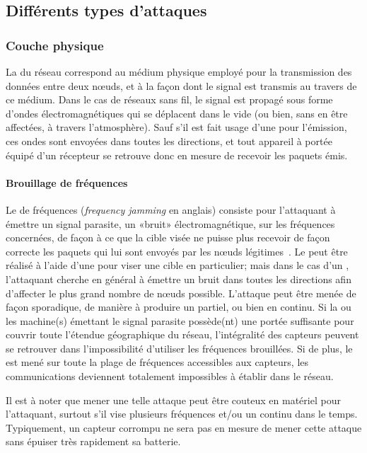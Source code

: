 \subsection{Différents types d'attaques}

    \subsubsection{Couche physique}
La  du réseau correspond au médium physique employé pour la transmission des données entre deux nœuds, et à la façon dont le signal est transmis au travers de ce médium.
Dans le cas de réseaux sans fil, le signal est propagé sous forme d'ondes électromagnétiques qui se déplacent dans le vide (ou bien, sans en être affectées, à travers l'atmosphère).
Sauf s'il est fait usage d'une  pour l'émission, ces ondes sont envoyées dans toutes les directions, et tout appareil à portée équipé d'un récepteur se retrouve donc en mesure de recevoir les paquets émis.

        \paragraph{Brouillage de fréquences}
        Le  de fréquences (\textit{frequency jamming} en anglais) consiste pour l'attaquant à émettre un signal parasite, un «bruit» électromagnétique, sur les fréquences concernées, de façon à ce que la cible visée ne puisse plus recevoir de façon correcte les paquets qui lui sont envoyés par les nœuds légitimes~\cite{PI11}.
Le  peut être réalisé à l'aide d'une  pour viser une cible en particulier; mais dans le cas d'un \rc, l'attaquant cherche en général à émettre un bruit dans toutes les directions afin d'affecter le plus grand nombre de nœuds possible.
L'attaque peut être menée de façon sporadique, de manière à produire un \dds partiel, ou bien en continu.
Si la ou les machine(s) émettant le signal parasite possède(nt) une portée suffisante pour couvrir toute l'étendue géographique du réseau, l'intégralité des capteurs peuvent se retrouver dans l'impossibilité d'utiliser les fréquences brouillées.
Si de plus, le  est mené sur toute la plage de fréquences accessibles aux capteurs, les communications deviennent totalement impossibles à établir dans le réseau.

Il est à noter que mener une telle attaque peut être couteux en matériel pour l'attaquant, surtout s'il vise plusieurs fréquences et/ou un  continu dans le temps.
Typiquement, un capteur corrompu ne sera pas en mesure de mener cette attaque sans épuiser très rapidement sa batterie.

